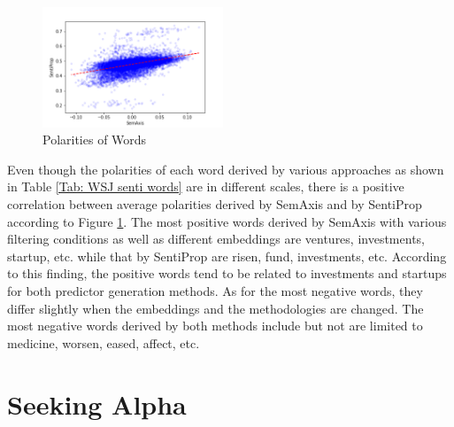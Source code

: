 \documentclass[a4paper, 12pt]{report}
\begin{document}
    
    \begin{figure}
        \begin{center}
            \includegraphics[width=0.48\textwidth]{graphs/words_ploar1.png}
        \end{center}
        \caption{Polarities of Words}
    \label{fig: words}
    \end{figure}
    
    Even though the polarities of each word derived by various approaches as shown in Table \ref{Tab: WSJ senti words} are in different scales, there is a positive correlation between average polarities derived by SemAxis and by SentiProp according to Figure \ref{fig: words}. The most positive words derived by SemAxis with various filtering conditions as well as different embeddings are ventures, investments, startup, etc. while that by SentiProp are risen, fund, investments, etc. According to this finding, the positive words tend to be related to investments and startups for both predictor generation methods. As for the most negative words,  they differ slightly when the embeddings and the methodologies are changed. The most negative words derived by both methods include but not are limited to medicine, worsen, eased, affect, etc.
    
    
    \section{Seeking Alpha}
    
\end{document}
